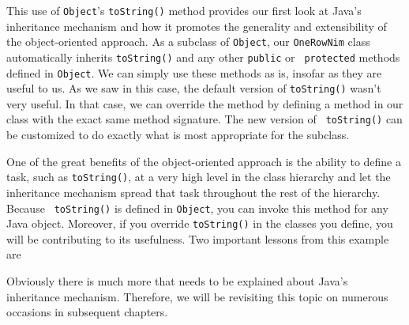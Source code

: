 \noindent This use of {\tt Object}'s {\tt toString()} method provides our first
look at Java's inheritance mechanism and how it promotes the
generality and extensibility of the object-oriented approach.  As a
subclass of {\tt Object}, our {\tt OneRowNim} class automatically
inherits {\tt toString()} and any other {\tt public} or {\tt
protected} methods defined in {\tt Object}.  We can simply use these
methods as is, insofar as they are useful to us.  As we saw in this
case, the default version of {\tt toString()} wasn't very useful.  In
that case, we can override the method by defining a method in our
class with the exact same method signature.  The new version of {\tt
toString()} can be customized to do exactly what is most appropriate
for the subclass.

One of the great benefits of the object-oriented approach is the
ability to define a task, such as {\tt toString()}, at a very high
level in the class hierarchy and let the inheritance mechanism spread
that task throughout the rest of the hierarchy.  Because {\tt
toString()} is defined in {\tt Object}, you can invoke this method for
any Java object.  Moreover, if you override {\tt toString()} in the
classes you define, you will be contributing to its usefulness.  Two
important lessons from this example are




\noindent Obviously there is much more that needs to be explained
about Java's inheritance mechanism.  Therefore, we will be revisiting
this topic on numerous occasions in subsequent chapters.


